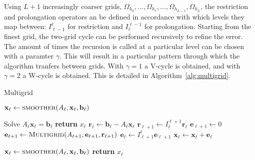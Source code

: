 Using $L + 1$ increasingly coarser grids, $\Omega_{h_0}, \ldots, \Omega_{h_{\ell}}, \ldots, \Omega_{h_{L-1}}, \Omega_{h_L}$, the restriction and prolongation operators an be defined in accordance with which levels they map between: $I_{\ell-1}^\ell$ for restriction and $I_\ell^{\ell-1}$ for prolongation. Starting from the finest grid, the two-grid cycle can be performed recursively to refine the error. The amount of times the recursion is called at a particular level can be chosen with a paramter $\gamma$. This will result in a particular pattern through which the algorithm tranfers between grids. With $\gamma = 1$ a V-cycle is obtained, and with $\gamma = 2$ a W-cycle is obtained. This is detailed in Algorithm~\ref{alg:multigrid}.

\begin{algorithm}
	\caption{Multigrid}\label{alg:multigrid}
	\begin{algorithmic}[1]
			\State $\mathbf{x}_\ell \gets \Call{smoother}{A_\ell, \mathbf{x}_\ell, \mathbf{b}_\ell}$ 
		\EndFor

			\State Solve $A_\ell \mathbf{x}_\ell = \mathbf{b}_\ell$ 
			\State \textbf{return} $x_\ell$
		\Else
			\State $\mathbf{r}_\ell \gets \mathbf{b}_\ell - A_\ell \mathbf{x}_\ell$ 
			\State $\mathbf{r}_{\ell+1} \gets I_{\ell}^{\ell + 1} \mathbf{r}_\ell$ 
			\State $\mathbf{e}_{\ell+1} \gets 0$
				\State $\mathbf{e}_{\ell+1} \gets \Call{Multigrid}{A_{\ell+1}, \mathbf{e}_{\ell+1}, \mathbf{r}_{\ell+1}}$ 
			\EndFor
			\State $\mathbf{e}_{\ell} \gets I_{\ell + 1}^{\ell} \mathbf{e}_{\ell+1}$ 
			\State $\mathbf{x}_{\ell} \gets \mathbf{x}_{\ell} + \mathbf{e}_{\ell}$ 
		\EndIf

			\State $\mathbf{x}_\ell \gets \Call{smoother}{A_\ell, \mathbf{x}_\ell, \mathbf{b}_\ell}$ 
		\EndFor
		\State \textbf{return} $x_\ell$
		\EndProcedure
	\end{algorithmic}
\end{algorithm}


